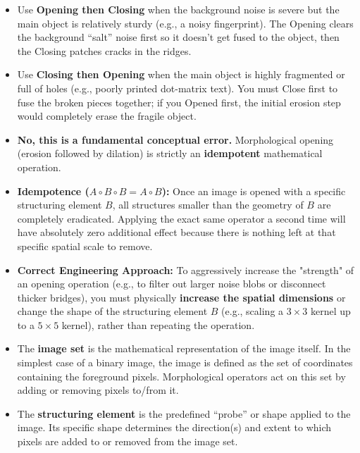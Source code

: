 {
\begin{itemize}
    \item Use \textbf{Opening then Closing} when the background noise is severe but the main object is relatively sturdy (e.g., a noisy fingerprint). The Opening clears the background ``salt'' noise first so it doesn't get fused to the object, then the Closing patches cracks in the ridges.
    \item Use \textbf{Closing then Opening} when the main object is highly fragmented or full of holes (e.g., poorly printed dot-matrix text). You must Close first to fuse the broken pieces together; if you Opened first, the initial erosion step would completely erase the fragile object.
\end{itemize}
}

{
\begin{itemize}
    \item \textbf{No, this is a fundamental conceptual error.} Morphological opening (erosion followed by dilation) is strictly an \textbf{idempotent} mathematical operation.
    \item \textbf{Idempotence ($A \circ B \circ B = A \circ B$):} Once an image is opened with a specific structuring element $B$, all structures smaller than the geometry of $B$ are completely eradicated. Applying the exact same operator a second time will have absolutely zero additional effect because there is nothing left at that specific spatial scale to remove.
    \item \textbf{Correct Engineering Approach:} To aggressively increase the "strength" of an opening operation (e.g., to filter out larger noise blobs or disconnect thicker bridges), you must physically \textbf{increase the spatial dimensions} or change the shape of the structuring element $B$ (e.g., scaling a $3 \times 3$ kernel up to a $5 \times 5$ kernel), rather than repeating the operation.
\end{itemize}
}

{
\begin{itemize}
    \item The \textbf{image set} is the mathematical representation of the image itself. In the simplest case of a binary image, the image is defined as the set of coordinates containing the foreground pixels. Morphological operators act on this set by adding or removing pixels to/from it.
    \item The \textbf{structuring element} is the predefined ``probe'' or shape applied to the image. Its specific shape determines the direction(s) and extent to which pixels are added to or removed from the image set.
\end{itemize}
}

